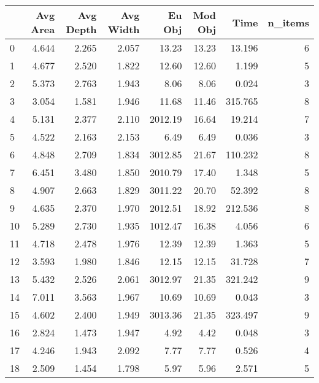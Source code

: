 \begin{tabular}{lrrrrrrr}
\toprule
{} &  Avg Area &  Avg Depth &  Avg Width &   Eu Obj &  Mod Obj &     Time &  n\_items \\
\midrule
0  &     4.644 &      2.265 &      2.057 &    13.23 &    13.23 &   13.196 &        6 \\
1  &     4.677 &      2.520 &      1.822 &    12.60 &    12.60 &    1.199 &        5 \\
2  &     5.373 &      2.763 &      1.943 &     8.06 &     8.06 &    0.024 &        3 \\
3  &     3.054 &      1.581 &      1.946 &    11.68 &    11.46 &  315.765 &        8 \\
4  &     5.131 &      2.377 &      2.110 &  2012.19 &    16.64 &   19.214 &        7 \\
5  &     4.522 &      2.163 &      2.153 &     6.49 &     6.49 &    0.036 &        3 \\
6  &     4.848 &      2.709 &      1.834 &  3012.85 &    21.67 &  110.232 &        8 \\
7  &     6.451 &      3.480 &      1.850 &  2010.79 &    17.40 &    1.348 &        5 \\
8  &     4.907 &      2.663 &      1.829 &  3011.22 &    20.70 &   52.392 &        8 \\
9  &     4.635 &      2.370 &      1.970 &  2012.51 &    18.92 &  212.536 &        8 \\
10 &     5.289 &      2.730 &      1.935 &  1012.47 &    16.38 &    4.056 &        6 \\
11 &     4.718 &      2.478 &      1.976 &    12.39 &    12.39 &    1.363 &        5 \\
12 &     3.593 &      1.980 &      1.846 &    12.15 &    12.15 &   31.728 &        7 \\
13 &     5.432 &      2.526 &      2.061 &  3012.97 &    21.35 &  321.242 &        9 \\
14 &     7.011 &      3.563 &      1.967 &    10.69 &    10.69 &    0.043 &        3 \\
15 &     4.602 &      2.400 &      1.949 &  3013.36 &    21.35 &  323.497 &        9 \\
16 &     2.824 &      1.473 &      1.947 &     4.92 &     4.42 &    0.048 &        3 \\
17 &     4.246 &      1.943 &      2.092 &     7.77 &     7.77 &    0.526 &        4 \\
18 &     2.509 &      1.454 &      1.798 &     5.97 &     5.96 &    2.571 &        5 \\

\end{tabular}
